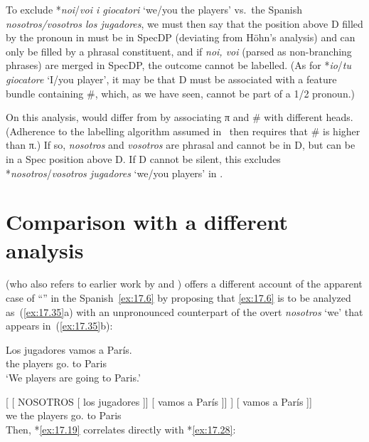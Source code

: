 \documentclass[output=paper]{langsci/langscibook}
\begin{document}
To exclude *\emph{noi}/\emph{voi i giocatori} ‘we/you the players’ vs.\ the
Spanish \emph{nosotros/vos\-otros los jugadores}, we must then say that
the position above D filled by the pronoun in  must be in SpecDP
(deviating from Höhn’s analysis) and can only be filled by a phrasal
constituent, and if \emph{noi, voi} (parsed as non-branching phrases) are
merged in SpecDP, the outcome cannot be labelled. (As for *\emph{io}/\emph{tu
giocatore} ‘I/you player’, it may be that D must be associated with a feature
bundle containing \#, which, as we have seen, cannot be part of a 1/2 \Sg{}
pronoun.)

On this analysis,  would differ from  by associating
π and \# with different heads. (Adherence to the labelling
algorithm assumed in~ then requires that \# is higher than
π.) If so, \emph{nosotros} and \emph{vosotros} are phrasal and cannot be in D,
but can be in a Spec position above D. If D cannot be silent, this excludes
*\emph{nosotros}/\emph{vosotros jugadores} ‘we/you players’ in .

\section{Comparison with a different analysis}\label{sec:17.7}

\textcite{Hoehn2016} (who also refers to earlier work by \citealt{Hurtado1985}
and \citealt{AckemaNeeleman2013}) offers a different account of the apparent
case of “” in the Spanish~\eqref{ex:17.6} by proposing
that \eqref{ex:17.6} is to be analyzed as~(\ref{ex:17.35}a) with an
unpronounced counterpart of the overt \emph{nosotros} ‘we’ that appears
in~(\ref{ex:17.35}b):

\begin{exe}
\exi{\eqref{ex:17.6}}
    \gll    Los jugadores vamos a París.\\
            the players      go.\Fpl{} to Paris\\
    \glt    ‘We players are going to Paris.’
\end{exe}

\ea\label{ex:17.35}
    \ea {}[ [ NOSOTROS [ los jugadores ]] [ vamos a París ]]
    \ex
    \gll    [\tss{IP} [\tss{PersP} nosotros [\tss{DP} los jugadores ]] [ vamos a París ]]\\
            {} {} we {} the players {} go.\Fpl{} to Paris\\
    \z
\z
Then, *\eqref{ex:17.19} correlates directly with *\eqref{ex:17.28}:
\end{document}
